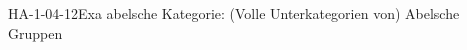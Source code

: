 
\begin{EXA}{HA-1-04-12}{Exa abelsche Kategorie: (Volle Unterkategorien von) Abelsche Gruppen}
\end{EXA}
